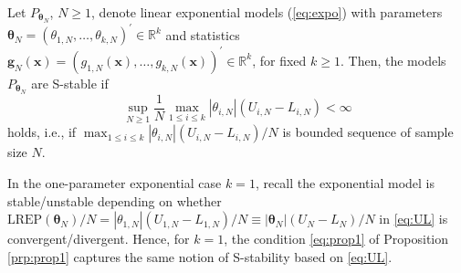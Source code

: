 \documentclass[numbib]{imamat}
\theoremstyle{theorem}
\theoremstyle{lemma}
\theoremstyle{example}
\theoremstyle{corollary}
\theoremstyle{definition}
\theoremstyle{remark}
\theoremstyle{approximation}
\theoremstyle{scheme}
\newcommand{\REP}{\mathrm{LREP}}
\let\BeginKnitrBlock\begin \let\EndKnitrBlock\end
\begin{document}
\BeginKnitrBlock{proposition}
\protect\hypertarget{prp:prop1}{}{\label{prp:prop1} }Let
\(P_{\boldsymbol \theta_N}\), \(N \geq 1\), denote linear exponential
models (\ref{eq:expo}) with parameters
\(\boldsymbol \theta_N = (\theta_{1,N},\ldots,\theta_{k,N})^\prime \in \mathbb{R}^k\)
and statistics
\(\boldsymbol g_N(\boldsymbol x) = (g_{1,N}(\boldsymbol x),\ldots, g_{k,N}(\boldsymbol x))^\prime \in \mathbb{R}^k\),
for fixed \(k \geq 1\). Then, the models \(P_{\boldsymbol \theta_N}\)
are S-stable if \begin{equation}
\label{eq:prop1}
\sup_{N \geq 1}\frac{1}{N} \max_{1 \leq i \leq k }|\theta_{i,N}|(U_{i,N}-L_{i,N})<\infty
\end{equation} holds, i.e., if
\(\max_{1 \leq i \leq k } |\theta_{i,N}|(U_{i,N}-L_{i,N})/N\) is bounded
sequence of sample size \(N\).
\EndKnitrBlock{proposition}

\BeginKnitrBlock{remark}
\iffalse{} {Remark. } \fi{}In the one-parameter exponential case
\(k=1\), recall the exponential model is stable/unstable depending on
whether
\(\REP(\boldsymbol \theta_N)/N = |\theta_{1,N}|(U_{1,N}-L_{1,N})/N \equiv |\boldsymbol \theta_{N}|(U_{N}-L_{N})/N\)
in \eqref{eq:UL} is convergent/divergent. Hence, for \(k=1\), the
condition \eqref{eq:prop1} of Proposition \ref{prp:prop1} captures the
same notion of S-stability based on \eqref{eq:UL}.
\EndKnitrBlock{remark}
\end{document}
